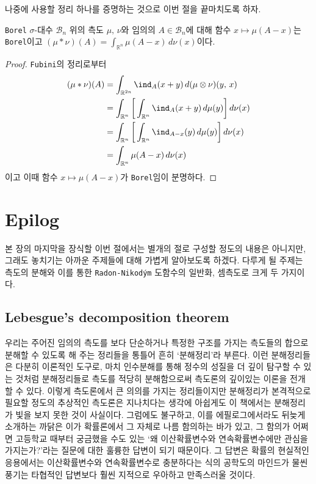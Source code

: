 나중에 사용할 정리 하나를 증명하는 것으로 이번 절을 끝마치도록 하자.

\begin{theorem}
    \texttt{Borel} $\sigma$-대수 $\mathcal{B}_n$ 위의 측도 $\mu,\,\nu$와 임의의 $A\in\mathcal{B}_n$에 대해 함수 $x\mapsto\mu(A-x)$는 \texttt{Borel}이고 $(\mu*\nu)(A)=\int_{\mathbb{R}^n}\mu(A-x)\,d\nu(x)$이다.
\end{theorem}

\begin{proof}
    \texttt{Fubini}의 정리로부터
    \begin{align*}
        (\mu*\nu)(A)&=\int_{\mathbb{R}^{2n}}\ind_A(x+y)\,d(\mu\otimes\nu)(y,\,x)\\
        &=\int_{\mathbb{R}^n}\bigg[\int_{\mathbb{R}^n}\ind_A(x+y)\,d\mu(y)\bigg]\,d\nu(x)\\
        &=\int_{\mathbb{R}^n}\bigg[\int_{\mathbb{R}^n}\ind_{A-x}(y)\,d\mu(y)\bigg]\,d\nu(x)\\
        &=\int_{\mathbb{R}^n}\mu(A-x)\,d\nu(x)
    \end{align*}
    이고 이때 함수 $x\mapsto\mu(A-x)$가 \texttt{Borel}임이 분명하다.
\end{proof}

\section{Epilog}

본 장의 마지막을 장식할 이번 절에서는 별개의 절로 구성할 정도의 내용은 아니지만, 그래도 놓치기는 아까운 주제들에 대해 가볍게 알아보도록 하겠다. 다루게 될 주제는 측도의 분해와 이를 통한 \texttt{Radon-Nikod\'ym} 도함수의 일반화, 셈측도로 크게 두 가지이다.

\subsection{Lebesgue's decomposition theorem}

우리는 주어진 임의의 측도를 보다 단순하거나 특정한 구조를 가지는 측도들의 합으로 분해할 수 있도록 해 주는 정리들을 통틀어 흔히 `분해정리'라 부른다. 이런 분해정리들은 다분히 이론적인 도구로, 마치 인수분해를 통해 정수의 성질을 더 깊이 탐구할 수 있는 것처럼 분해정리들로 측도를 적당히 분해함으로써 측도론의 깊이있는 이론을 전개할 수 있다. 이렇게 측도론에서 큰 의의를 가지는 정리들이지만 분해정리가 본격적으로 필요할 정도의 추상적인 측도론은 지나치다는 생각에 아쉽게도 이 책에서는 분해정리가 빛을 보지 못한 것이 사실이다. 그럼에도 불구하고, 이를 에필로그에서라도 뒤늦게 소개하는 까닭은 이가 확률론에서 그 자체로 나름 함의하는 바가 있고, 그 함의가 어쩌면 고등학교 때부터 궁금했을 수도 있는 `왜 이산확률변수와 연속확률변수에만 관심을 가지는가?'라는 질문에 대한 훌륭한 답변이 되기 때문이다. 그 답변은 확률의 현실적인 응용에서는 이산확률변수와 연속확률변수로 충분하다는 식의 공학도의 마인드가 물씬 풍기는 타협적인 답변보다 훨씬 지적으로 우아하고 만족스러울 것이다.

